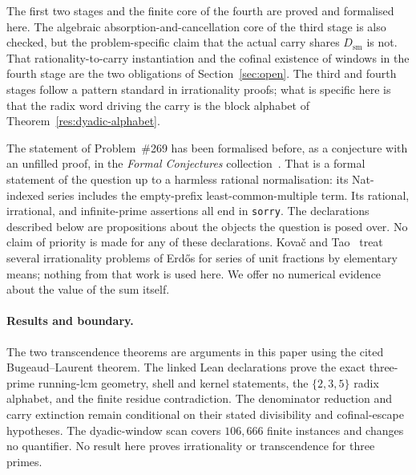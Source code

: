 \documentclass[11pt]{article}
\begin{document}
The first two stages and the finite core of the fourth are proved and
formalised here.  The algebraic absorption-and-cancellation core of the third
stage is also checked, but the problem-specific claim that the actual carry
shares $D_{\mathrm{sm}}$ is not.  That rationality-to-carry instantiation and
the cofinal existence of windows in the fourth stage are the two obligations
of Section~\ref{sec:open}.  The third and fourth stages follow a pattern
standard in irrationality proofs; what is specific here is that the radix word
driving the carry is the block alphabet of
Theorem~\ref{res:dyadic-alphabet}.

The statement of Problem~\#269 has been formalised before, as a conjecture with
an unfilled proof, in the \emph{Formal Conjectures}
collection~\cite{formalconjectures269}.  That is a formal statement of the
question up to a harmless rational normalisation: its Nat-indexed series
includes the empty-prefix least-common-multiple term.  Its rational,
irrational, and infinite-prime assertions all end in \texttt{sorry}.
The declarations described below are propositions about the objects
the question is posed over.  No claim of priority is made for any of these
declarations.  Kova\v{c} and Tao~\cite{kovactao2024} treat several
irrationality problems of Erd\H{o}s for series of unit fractions by elementary
means; nothing from that work is used here.  We offer no numerical evidence
about the value of the sum itself.

\statusboundary

\paragraph{Results and boundary.}
The two transcendence theorems are arguments in this paper using the cited
Bugeaud--Laurent theorem.  The linked Lean declarations prove the exact
three-prime running-lcm geometry, shell and kernel statements, the
\(\{2,3,5\}\) radix alphabet, and the finite residue contradiction.  The
denominator reduction and carry extinction remain conditional on their stated
divisibility and cofinal-escape hypotheses.  The dyadic-window scan covers
\(106{,}666\) finite instances and changes no quantifier.  No result here proves
irrationality or transcendence for three primes.
\end{document}
